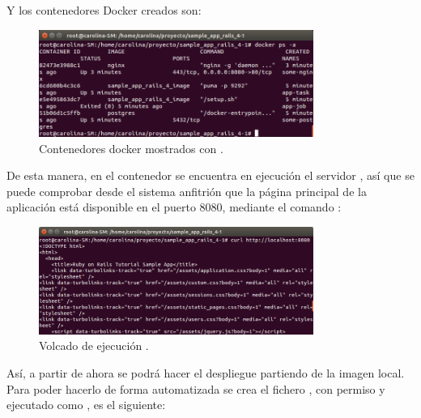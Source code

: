 Y los contenedores Docker creados son:

\begin{figure}[H]
\centering
\includegraphics[width=0.8\textwidth]{images/figures/dockerps.png}
\caption{Contenedores docker mostrados con .\label{fig:figure_placement_example}}
\end{figure}

De esta manera, en el contenedor  se encuentra en ejecución el servidor , así que se puede comprobar desde el sistema anfitrión que la página principal de la aplicación  está disponible en el puerto 8080, mediante el comando :

\begin{figure}[H]
\centering
\includegraphics[width=0.8\textwidth]{images/figures/curldocker.png}
\caption{Volcado de ejecución .\label{fig:figure_placement_example}}
\end{figure}

Así, a partir de ahora se podrá hacer el despliegue partiendo de la imagen local. Para poder hacerlo de forma automatizada se crea el fichero , con permiso  y ejecutado como , es el siguiente:

